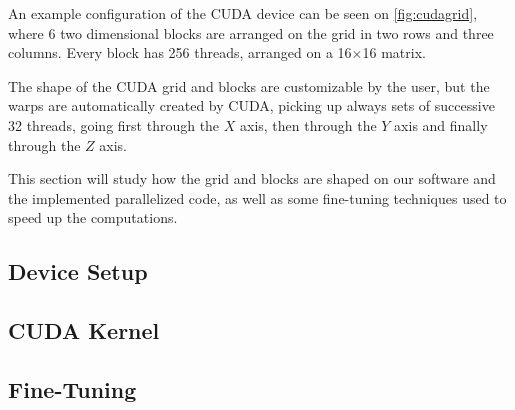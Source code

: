 An example configuration of the \ac{CUDA} device can be seen on \autoref{fig:cudagrid}, where 6 two dimensional blocks are arranged on the grid in two rows and three columns. Every block has 256 threads, arranged on a 16$\times$16 matrix.

The shape of the \ac{CUDA} grid and blocks are customizable by the user, but the warps are automatically created by \ac{CUDA}, picking up always sets of successive 32 threads, going first through the $X$ axis, then through the $Y$ axis and finally through the $Z$ axis.

This section will study how the grid and blocks are shaped on our software and the implemented parallelized code, as well as some fine-tuning techniques used to speed up the computations.

\subsection{Device Setup}
\subsection{CUDA Kernel}
\subsection{Fine-Tuning}